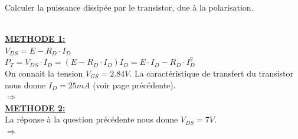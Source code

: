%

%	
%	
%	

\Question
{%
Calculer la puissance dissipée par le transistor, due à la polarisation.

}
{
~\\
\underline{\textbf{METHODE 1:}}\\

$V_{DS}=E-R_D\cdot I_{D}$\\
 
$P_{T}=V_{DS}\cdot I_{D}=\left(E-R_D\cdot I_{D}\right)I_{D}=E\cdot I_{D}-R_D\cdot I_{D}^2$\\
	
On connait la tension $V_{GS}=2.84V$. La caractéristique de transfert du transistor nous donne $I_{D}=25mA$ (voir page précédente).\\

$\Rightarrow$ \\

\underline{\textbf{METHODE 2:}}\\

La réponse à la question précédente nous donne $V_{DS}=7V$.\\
$\Rightarrow$ 

}




